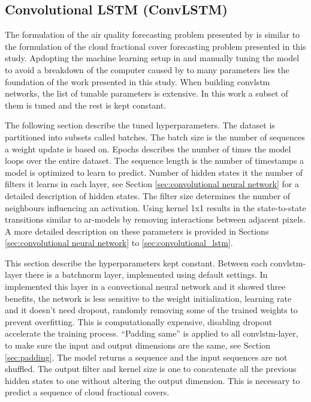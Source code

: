 \clearpage

\subsection{Convolutional LSTM (ConvLSTM)}
The formulation of the air quality forecasting problem presented by \citeauthor{SunAirLSTM} is similar to the formulation of the cloud fractional cover forecasting problem presented in this study. 
Apdopting the machine learning setup in  and manually tuning the model to avoid a breakdown of the computer caused by to many parameters lies the foundation of the work presented in this study. When building \acrshort{convlstm} networks, the list of tunable parameters is extensive. In this work a subset of them is tuned and the rest is kept constant.

The following section describe the tuned hyperparameters. The dataset is partitioned into subsets called batches. The batch size is the number of sequences a weight update is based on. Epochs describes the number of times the model loops over the entire dataset. The sequence length is the number of timestamps a model is optimized to learn to predict. Number of hidden states it the number of filters it learns in each layer, see Section \ref{sec:convolutional neural network} for a detailed description of hidden states. 
The filter size determines the number of neighbours influencing an activation. Using kernel 1x1 results in the state-to-state transitions similar to \acrshort{ar}-models by removing interactions between adjacent pixels. A more detailed description on these parameters is provided in Sections \ref{sec:convolutional neural network} to \ref{sec:convolutional_lstm}. 

This section describe the hyperparameters kept constant. Between each \acrshort{convlstm}-layer there is a \acrfull{batchnorm} layer, implemented using default settings. In  implemented this layer in a convectional neural network and it showed three benefits, the network is less sensitive to the weight initialization, learning rate and it doesn't need dropout, randomly removing some of the trained weights to prevent overfitting. This is computationally expensive, disabling dropout accelerate the training process.
``Padding same'' is applied to all \acrshort{convlstm}-layer, to make sure the input and output dimensions are the same, see Section \ref{sec:padding}. The model returns a sequence and the input sequences are not shuffled. The output filter and kernel size is one to concatenate all the previous hidden states to one without altering the output dimension. This is necessary to predict a sequence of cloud fractional covers. 

